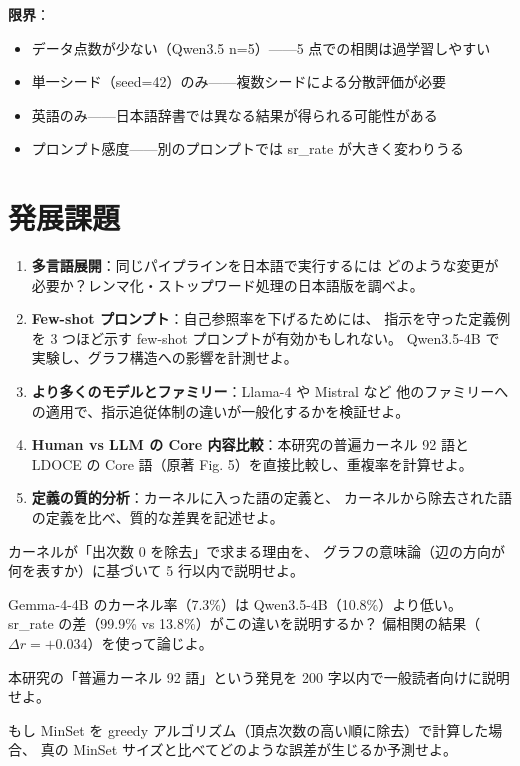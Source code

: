 \documentclass[lang=jp, color=black, mode=simple, 11pt]{elegantbook}
\begin{document}
\begin{note}
  \textbf{限界}：
  \begin{itemize}
    \item データ点数が少ない（Qwen3.5 n=5）——5 点での相関は過学習しやすい
    \item 単一シード（seed=42）のみ——複数シードによる分散評価が必要
    \item 英語のみ——日本語辞書では異なる結果が得られる可能性がある
    \item プロンプト感度——別のプロンプトでは sr\_rate が大きく変わりうる
  \end{itemize}
\end{note}

\section{発展課題}

\begin{reflect}
\begin{enumerate}
  \item \textbf{多言語展開}：同じパイプラインを日本語で実行するには
        どのような変更が必要か？レンマ化・ストップワード処理の日本語版を調べよ。
  \item \textbf{Few-shot プロンプト}：自己参照率を下げるためには、
        指示を守った定義例を 3 つほど示す few-shot プロンプトが有効かもしれない。
        Qwen3.5-4B で実験し、グラフ構造への影響を計測せよ。
  \item \textbf{より多くのモデルとファミリー}：Llama-4 や Mistral など
        他のファミリーへの適用で、指示追従体制の違いが一般化するかを検証せよ。
  \item \textbf{Human vs LLM の Core 内容比較}：本研究の普遍カーネル 92 語と
        LDOCE の Core 語（原著 Fig. 5）を直接比較し、重複率を計算せよ。
  \item \textbf{定義の質的分析}：カーネルに入った語の定義と、
        カーネルから除去された語の定義を比べ、質的な差異を記述せよ。
\end{enumerate}
\end{reflect}

\begin{problemset}[第 4 章・総合確認問題]
  \item カーネルが「出次数 0 を除去」で求まる理由を、
        グラフの意味論（辺の方向が何を表すか）に基づいて 5 行以内で説明せよ。
  \item Gemma-4-4B のカーネル率（7.3\%）は Qwen3.5-4B（10.8\%）より低い。
        sr\_rate の差（99.9\% vs 13.8\%）がこの違いを説明するか？
        偏相関の結果（$\Delta r = +0.034$）を使って論じよ。
  \item 本研究の「普遍カーネル 92 語」という発見を 200 字以内で一般読者向けに説明せよ。
  \item もし MinSet を greedy アルゴリズム（頂点次数の高い順に除去）で計算した場合、
        真の MinSet サイズと比べてどのような誤差が生じるか予測せよ。
\end{problemset}
\end{document}
